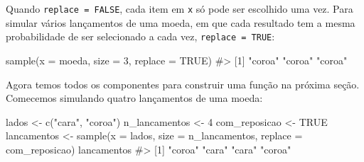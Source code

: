 \documentclass[
  letterpaper,
]{book}
\newenvironment{Shaded}{\begin{snugshade}}{\end{snugshade}}
\newcommand{\AttributeTok}[1]{\textcolor[rgb]{0.40,0.45,0.13}{#1}}
\newcommand{\CommentTok}[1]{\textcolor[rgb]{0.37,0.37,0.37}{#1}}
\newcommand{\ConstantTok}[1]{\textcolor[rgb]{0.56,0.35,0.01}{#1}}
\newcommand{\DecValTok}[1]{\textcolor[rgb]{0.68,0.00,0.00}{#1}}
\newcommand{\FunctionTok}[1]{\textcolor[rgb]{0.28,0.35,0.67}{#1}}
\newcommand{\NormalTok}[1]{\textcolor[rgb]{0.00,0.23,0.31}{#1}}
\newcommand{\OtherTok}[1]{\textcolor[rgb]{0.00,0.23,0.31}{#1}}
\newcommand{\StringTok}[1]{\textcolor[rgb]{0.13,0.47,0.30}{#1}}
\theoremstyle{definition}
\theoremstyle{plain}
\theoremstyle{remark}
\begin{document}
\begin{figure}


\caption{\label{fig-help-sample-replace}}

\end{figure}%

Quando \texttt{replace\ =\ FALSE}, cada item em \texttt{x} só pode ser
escolhido uma vez. Para simular vários lançamentos de uma moeda, em que
cada resultado tem a mesma probabilidade de ser selecionado a cada vez,
\texttt{replace\ =\ TRUE}:

\begin{Shaded}
\begin{Highlighting}[]
\FunctionTok{sample}\NormalTok{(}\AttributeTok{x =}\NormalTok{ moeda, }\AttributeTok{size =} \DecValTok{3}\NormalTok{, }\AttributeTok{replace =} \ConstantTok{TRUE}\NormalTok{)}
\CommentTok{\#\textgreater{} [1] "coroa" "coroa" "coroa"}
\end{Highlighting}
\end{Shaded}

Agora temos todos os componentes para construir uma função na próxima
seção. Comecemos simulando quatro lançamentos de uma moeda:

\begin{Shaded}
\begin{Highlighting}[]
\NormalTok{lados }\OtherTok{\textless{}{-}} \FunctionTok{c}\NormalTok{(}\StringTok{"cara"}\NormalTok{, }\StringTok{"coroa"}\NormalTok{)}
\NormalTok{n\_lancamentos }\OtherTok{\textless{}{-}} \DecValTok{4}
\NormalTok{com\_reposicao }\OtherTok{\textless{}{-}} \ConstantTok{TRUE}
\NormalTok{lancamentos }\OtherTok{\textless{}{-}} \FunctionTok{sample}\NormalTok{(}\AttributeTok{x =}\NormalTok{ lados, }\AttributeTok{size =}\NormalTok{ n\_lancamentos, }\AttributeTok{replace =}\NormalTok{ com\_reposicao)}
\NormalTok{lancamentos}
\CommentTok{\#\textgreater{} [1] "coroa" "cara"  "cara"  "coroa"}
\end{Highlighting}
\end{Shaded}
\end{document}
